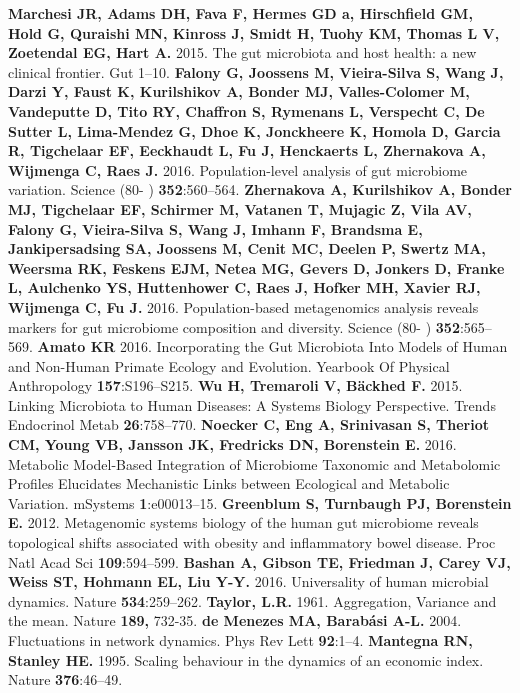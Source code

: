 \documentclass[12pt,oneside,letterpaper]{article}
\begin{document}
\begin{thebibliography}{99}
%
 {\bf Marchesi JR, Adams DH, Fava F, Hermes GD a, Hirschfield GM, Hold G, Quraishi MN, Kinross J, Smidt H, Tuohy KM, Thomas L V, Zoetendal EG, Hart A.} 2015. The gut microbiota and host health: a new clinical frontier. Gut 1–10.
 {\bf Falony G, Joossens M, Vieira-Silva S, Wang J, Darzi Y, Faust K, Kurilshikov A, Bonder MJ, Valles-Colomer M, Vandeputte D, Tito RY, Chaffron S, Rymenans L, Verspecht C, De Sutter L, Lima-Mendez G, Dhoe K, Jonckheere K, Homola D, Garcia R, Tigchelaar EF, Eeckhaudt L, Fu J, Henckaerts L, Zhernakova A, Wijmenga C, Raes J.} 2016. Population-level analysis of gut microbiome variation. Science (80- ) {\bf 352}:560–564.
 {\bf Zhernakova A, Kurilshikov A, Bonder MJ, Tigchelaar EF, Schirmer M, Vatanen T, Mujagic Z, Vila AV, Falony G, Vieira-Silva S, Wang J, Imhann F, Brandsma E, Jankipersadsing SA, Joossens M, Cenit MC, Deelen P, Swertz MA, Weersma RK, Feskens EJM, Netea MG, Gevers D, Jonkers D, Franke L, Aulchenko YS, Huttenhower C, Raes J, Hofker MH, Xavier RJ, Wijmenga C, Fu J.} 2016. Population-based metagenomics analysis reveals markers for gut microbiome composition and diversity. Science (80- ) {\bf 352}:565–569.
 {\bf Amato KR} 2016. Incorporating the Gut Microbiota Into Models of Human and Non-Human Primate Ecology and Evolution. Yearbook Of Physical Anthropology {\bf 157}:S196–S215.
 {\bf Wu H, Tremaroli V, Bäckhed F.} 2015. Linking Microbiota to Human Diseases: A Systems Biology Perspective. Trends Endocrinol Metab {\bf 26}:758–770.
 {\bf Noecker C, Eng A, Srinivasan S, Theriot CM, Young VB, Jansson JK, Fredricks DN, Borenstein E.} 2016. Metabolic Model-Based Integration of Microbiome Taxonomic and Metabolomic Profiles Elucidates Mechanistic Links between Ecological and Metabolic Variation. mSystems {\bf 1}:e00013–15.
 {\bf Greenblum S, Turnbaugh PJ, Borenstein E.} 2012. Metagenomic systems biology of the human gut microbiome reveals topological shifts associated with obesity and inflammatory bowel disease. Proc Natl Acad Sci {\bf 109}:594–599.
 {\bf Bashan A, Gibson TE, Friedman J, Carey VJ, Weiss ST, Hohmann EL, Liu Y-Y.} 2016. Universality of human microbial dynamics. Nature {\bf 534}:259–262.
 {\bf Taylor, L.R.} 1961. Aggregation, Variance and the mean. Nature {\bf 189,} 732-35.
 {\bf de Menezes MA, Barabási A-L.} 2004. Fluctuations in network dynamics. Phys Rev Lett {\bf 92}:1–4.
 {\bf Mantegna RN, Stanley HE.} 1995. Scaling behaviour in the dynamics of an economic index. Nature {\bf 376}:46–49.

\end{thebibliography}
\end{document}

